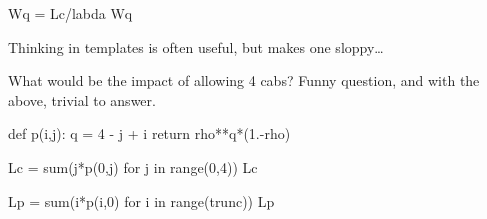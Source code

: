 \begin{exercise}[Hall 5.22]
\begin{solution}
\begin{pyconsole}
Wq = Lc/labda
Wq
\end{pyconsole}

Thinking in templates is often useful, but makes one sloppy\ldots

What would be the impact of allowing 4 cabs? Funny question, and with the above, trivial to answer.

\begin{pyconsole}
def p(i,j):
    q  = 4 - j + i
    return rho**q*(1.-rho)
  
\end{pyconsole}

\begin{pyconsole}
Lc = sum(j*p(0,j) for j in range(0,4))
Lc

Lp = sum(i*p(i,0) for i in range(trunc))
Lp
  
\end{pyconsole}
    \end{solution}
\end{exercise}







